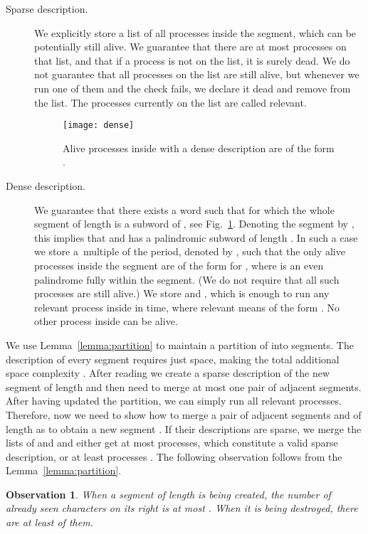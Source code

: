 \documentclass{article}[11pt,letter]
\newtheorem{observation}[definition]{Observation}
\begin{document}
\begin{description}
\item[Sparse description.] We explicitly store a list of all processes inside the segment, which can be potentially still alive.
We guarantee that there are at most  processes on that list, and that if a process is not on the list, it is surely dead. We do not guarantee
that all processes on the list are still alive, but whenever we run one of them and the check fails, we declare it dead and remove from the list.
The processes currently on the list are called relevant.

\begin{figure}[t]
\texttt{[image: dense]}
\caption{Alive processes inside  with a dense description are of the form .}
\label{fig:dense}
\end{figure}

\item[Dense description.] We guarantee that there exists a word  such that  for which the whole segment 
of length 
is a subword of , see Fig.~\ref{fig:dense}. Denoting the segment by , this implies that 
and  has a palindromic subword of length . In such a case we store a~multiple of the period, denoted by ,
such that the only alive processes inside the segment are of the form  for , where  is an even palindrome fully within the segment.
(We do not require that all such processes are still alive.) We store  and , which is enough to run any relevant process
inside  in  time, where relevant means of the form .
No other process inside  can be alive.
\end{description}

We use Lemma~\ref{lemma:partition} to maintain a partition of  into segments. The description of every segment requires
just  space, making the total additional space complexity . 
After reading  we create a sparse
description of the new segment of length  and then need to merge at most one pair of adjacent segments. After having updated the
partition, we can simply run all relevant processes.
Therefore, now we need to show how to merge a pair of adjacent segments  and  of length
 as to obtain a new segment . If their descriptions are sparse, we merge the lists of  and  and either get at most  processes, which constitute a valid sparse description,
or at least  processes . The following observation follows from the Lemma~\ref{lemma:partition}.

\begin{observation}
\label{obs:lifespan}
When a segment of length  is being created, the number of already seen characters on its right is at most
.
When it is being destroyed, there are at least  of them.
\end{observation}
\end{document}
